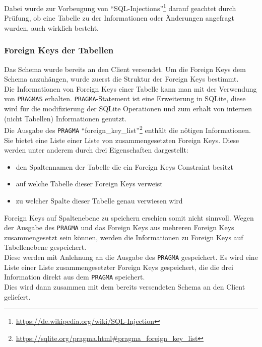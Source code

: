 Dabei wurde zur Vorbeugung von ``SQL-Injections''\footnote{\url{https://de.wikipedia.org/wiki/SQL-Injection}} darauf geachtet durch Prüfung, ob eine Tabelle zu der Informationen oder Änderungen angefragt wurden, auch wirklich besteht.

\subsubsection{Foreign Keys der Tabellen}
\label{subsubsec04:fk_table_server}
Das Schema wurde bereits an den Client versendet. Um die Foreign Keys dem Schema anzuhängen, wurde zuerst die Struktur der Foreign Keys bestimmt. \\
Die Informationen von Foreign Keys einer Tabelle kann man mit der Verwendung von \texttt{PRAGMAS} erhalten.
\texttt{PRAGMA}-Statement ist eine Erweiterung in SQLite, diese wird für die modifizierung der SQLite Operationen und zum erhalt von internen (nicht Tabellen) Informationen genutzt.\cite{sqlite_pragma} \\

Die Ausgabe des \texttt{PRAGMA} ``foreign\_key\_list''\footnote{\url{https://sqlite.org/pragma.html\#pragma_foreign_key_list}} enthält die nötigen Informationen. Sie bietet eine Liste einer Liste von zusammengesetzten Foreign Keys. Diese werden unter anderem durch drei Eigenschaften dargestellt:
\begin{itemize}
    \item den Spaltennamen der Tabelle die ein Foreign Keys Constraint besitzt
    \item auf welche Tabelle dieser Foreign Keys verweist
    \item zu welcher Spalte dieser Tabelle genau verwiesen wird
\end{itemize}

Foreign Keys auf Spaltenebene zu speichern erschien somit nicht sinnvoll. Wegen der Ausgabe des \texttt{PRAGMA} und das Foreign Keys aus mehreren Foreign Keys zusammengesetzt sein können, werden die Informationen zu Foreign Keys auf Tabellenebene gespeichert. \\
Diese werden mit Anlehnung an die Ausgabe des \texttt{PRAGMA} gespeichert. Es wird eine Liste einer Liste zusammengesetzter Foreign Keys gespeichert, die die drei Information direkt aus dem \texttt{PRAGMA} speichert. \\
Dies wird dann zusammen mit dem bereits versendeten Schema an den Client geliefert.   

